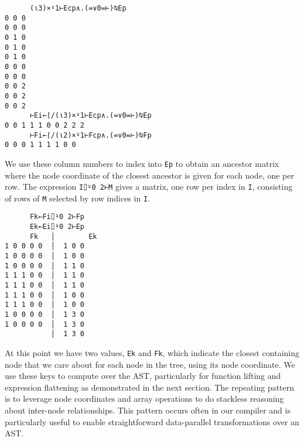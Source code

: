 ﻿\documentclass[numbers,10pt,preprint]{sigplanconf}
\begin{document}
\begin{verbatim}
      (⍳3)×⍤1⊢Ecp∧.(=∨0=⊢)⍉Ep
0 0 0
0 0 0
0 1 0
0 1 0
0 1 0
0 0 0
0 0 0
0 0 2
0 0 2
0 0 2
      ⊢Ei←⌈/(⍳3)×⍤1⊢Ecp∧.(=∨0=⊢)⍉Ep
0 0 1 1 1 0 0 2 2 2
      ⊢Fi←⌈/(⍳2)×⍤1⊢Fcp∧.(=∨0=⊢)⍉Fp
0 0 0 1 1 1 1 0 0
\end{verbatim}

\noindent We use these column numbers to index into \verb;Ep; to obtain an ancestor matrix where the node coordinate of the closest ancestor is given for each node, one per row. The expression \verb;I⌷⍤0 2⊢M; gives a matrix, one row per index in \verb;I;, consisting of rows of \verb;M; selected by row indices in \verb;I;.

\begin{verbatim}
      Fk←Fi⌷⍤0 2⊢Fp
      Ek←Ei⌷⍤0 2⊢Ep 
      Fk   │        Ek
1 0 0 0 0  │  1 0 0
1 0 0 0 0  │  1 0 0
1 0 0 0 0  │  1 1 0
1 1 1 0 0  │  1 1 0
1 1 1 0 0  │  1 1 0
1 1 1 0 0  │  1 0 0
1 1 1 0 0  │  1 0 0
1 0 0 0 0  │  1 3 0
1 0 0 0 0  │  1 3 0
           │  1 3 0
\end{verbatim}

\noindent At this point we have two values, \verb;Ek; and \verb;Fk;, which indicate the closest containing node that we care about for each node in the tree, using its node coordinate. We use these keys to compute over the AST, particularly for function lifting and expression flattening as demonstrated in the next section. The repeating pattern is to leverage node coordinates and array operations to do stackless reasoning about inter-node relationships. This pattern occurs often in our compiler and is particularly useful to enable straightforward data-parallel transformations over an AST.
\end{document}
